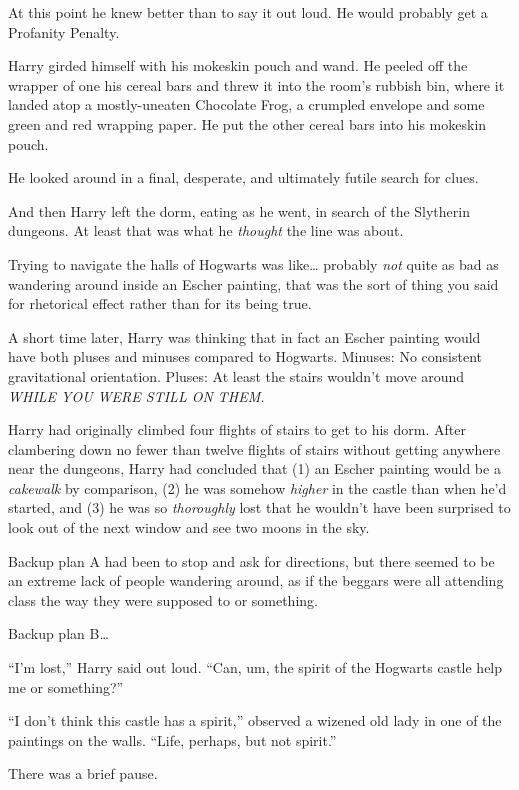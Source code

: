 At this point he knew better than to say it out loud. He would probably
get a Profanity Penalty.

Harry girded himself with his mokeskin pouch and wand. He peeled off the
wrapper of one his cereal bars and threw it into the room's rubbish bin,
where it landed atop a mostly-uneaten Chocolate Frog, a crumpled
envelope and some green and red wrapping paper. He put the other cereal
bars into his mokeskin pouch.

He looked around in a final, desperate, and ultimately futile search for
clues.

And then Harry left the dorm, eating as he went, in search of the
Slytherin dungeons. At least that was what he \emph{thought} the line
was about.

Trying to navigate the halls of Hogwarts was like\ldots{} probably
\emph{not} quite as bad as wandering around inside an Escher painting,
that was the sort of thing you said for rhetorical effect rather than
for its being true.

A short time later, Harry was thinking that in fact an Escher painting
would have both pluses and minuses compared to Hogwarts. Minuses: No
consistent gravitational orientation. Pluses: At least the stairs
wouldn't move around \emph{WHILE YOU WERE STILL ON THEM.}

Harry had originally climbed four flights of stairs to get to his dorm.
After clambering down no fewer than twelve flights of stairs without
getting anywhere near the dungeons, Harry had concluded that (1) an
Escher painting would be a \emph{cakewalk} by comparison, (2) he was
somehow \emph{higher} in the castle than when he'd started, and (3) he
was so \emph{thoroughly} lost that he wouldn't have been surprised to
look out of the next window and see two moons in the sky.

Backup plan A had been to stop and ask for directions, but there seemed
to be an extreme lack of people wandering around, as if the beggars were
all attending class the way they were supposed to or something.

Backup plan B\ldots{}

``I'm lost,'' Harry said out loud. ``Can, um, the spirit of the Hogwarts
castle help me or something?''

``I don't think this castle has a spirit,'' observed a wizened old lady
in one of the paintings on the walls. ``Life, perhaps, but not spirit.''

There was a brief pause.

